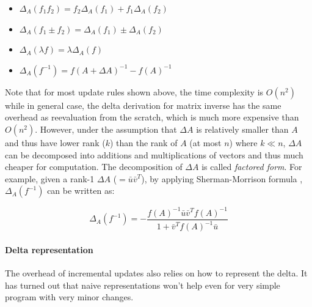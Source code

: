 \begin{center}
    \begin{minipage}{0.4\textwidth}
      \begin{itemize}
        \item $\Delta_A(f_1 f_2) = f_2\Delta_A(f_1) + f_1\Delta_A(f_2)$
        \item $\Delta_A(f_1 \pm f_2) = \Delta_A(f_1) \pm \Delta_A(f_2)$
        \item $\Delta_A(\lambda f) = \lambda \Delta_A(f)$
        \item $\Delta_A(f^{-1}) = f(A+\Delta A)^{-1}-f(A)^{-1}$
      \end{itemize}
    \end{minipage}
  \end{center}

Note that for most update rules shown above, the time complexity is $O(n^2)$ while in general case, the delta derivation for matrix inverse has the same overhead as reevaluation from the scratch, which is much more expensive than $O(n^2)$. However, under the assumption that $\Delta A$ is relatively smaller than $A$ and thus have lower rank ($k$) than the rank of $A$ (at most $n$) where $k \ll n$, $\Delta A$ can be decomposed into additions and multiplications of vectors and thus much cheaper for computation. The decomposition of $\Delta A$ is called {\em factored form}. For example, given a rank-1 $\Delta A$ ($=\bar{u}\bar{v}^T$), by applying Sherman-Morrison formula \cite{press2007numerical}, $\Delta_A(f^{-1})$ can be written as:

\begin{equation}\label{eq: matrix_inverse}
\Delta_A(f^{-1}) = -\frac{f(A)^{-1}\bar{u}\bar{v}^Tf(A)^{-1}}{1+\bar{v}^Tf(A)^{-1}\bar{u}}
\end{equation}

\paragraph{Delta representation}
The overhead of incremental updates also relies on how to represent the delta. It has turned out that naive representations won't help even for very simple program with very minor changes. 

